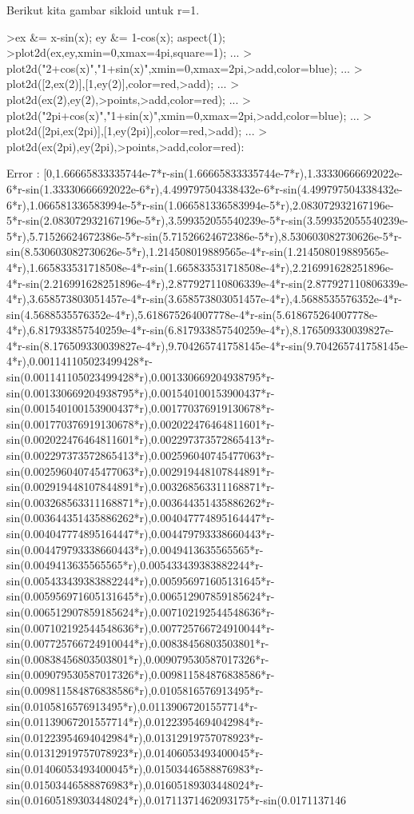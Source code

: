 \documentclass{article}
\begin{document}
\begin{eulernotebook}
\begin{eulercomment}
\begin{eulercomment}
\begin{eulercomment}
\begin{eulercomment}
\begin{euleroutput}
\end{euleroutput}
\begin{eulercomment}
Berikut kita gambar sikloid untuk r=1.
\end{eulercomment}
\begin{eulerprompt}
>ex &= x-sin(x); ey &= 1-cos(x); aspect(1);
>plot2d(ex,ey,xmin=0,xmax=4pi,square=1); ...
>  plot2d("2+cos(x)","1+sin(x)",xmin=0,xmax=2pi,>add,color=blue); ...
>  plot2d([2,ex(2)],[1,ey(2)],color=red,>add); ...
>  plot2d(ex(2),ey(2),>points,>add,color=red); ...
>  plot2d("2pi+cos(x)","1+sin(x)",xmin=0,xmax=2pi,>add,color=blue); ...
>  plot2d([2pi,ex(2pi)],[1,ey(2pi)],color=red,>add);  ...
>  plot2d(ex(2pi),ey(2pi),>points,>add,color=red):
\end{eulerprompt}
\begin{euleroutput}
  Error : [0,1.66665833335744e-7*r-sin(1.66665833335744e-7*r),1.33330666692022e-6*r-sin(1.33330666692022e-6*r),4.499797504338432e-6*r-sin(4.499797504338432e-6*r),1.066581336583994e-5*r-sin(1.066581336583994e-5*r),2.083072932167196e-5*r-sin(2.083072932167196e-5*r),3.599352055540239e-5*r-sin(3.599352055540239e-5*r),5.71526624672386e-5*r-sin(5.71526624672386e-5*r),8.530603082730626e-5*r-sin(8.530603082730626e-5*r),1.214508019889565e-4*r-sin(1.214508019889565e-4*r),1.665833531718508e-4*r-sin(1.665833531718508e-4*r),2.216991628251896e-4*r-sin(2.216991628251896e-4*r),2.877927110806339e-4*r-sin(2.877927110806339e-4*r),3.658573803051457e-4*r-sin(3.658573803051457e-4*r),4.5688535576352e-4*r-sin(4.5688535576352e-4*r),5.618675264007778e-4*r-sin(5.618675264007778e-4*r),6.817933857540259e-4*r-sin(6.817933857540259e-4*r),8.176509330039827e-4*r-sin(8.176509330039827e-4*r),9.704265741758145e-4*r-sin(9.704265741758145e-4*r),0.001141105023499428*r-sin(0.001141105023499428*r),0.001330669204938795*r-sin(0.001330669204938795*r),0.001540100153900437*r-sin(0.001540100153900437*r),0.001770376919130678*r-sin(0.001770376919130678*r),0.002022476464811601*r-sin(0.002022476464811601*r),0.002297373572865413*r-sin(0.002297373572865413*r),0.002596040745477063*r-sin(0.002596040745477063*r),0.002919448107844891*r-sin(0.002919448107844891*r),0.003268563311168871*r-sin(0.003268563311168871*r),0.003644351435886262*r-sin(0.003644351435886262*r),0.004047774895164447*r-sin(0.004047774895164447*r),0.004479793338660443*r-sin(0.004479793338660443*r),0.0049413635565565*r-sin(0.0049413635565565*r),0.005433439383882244*r-sin(0.005433439383882244*r),0.005956971605131645*r-sin(0.005956971605131645*r),0.006512907859185624*r-sin(0.006512907859185624*r),0.007102192544548636*r-sin(0.007102192544548636*r),0.007725766724910044*r-sin(0.007725766724910044*r),0.00838456803503801*r-sin(0.00838456803503801*r),0.009079530587017326*r-sin(0.009079530587017326*r),0.009811584876838586*r-sin(0.009811584876838586*r),0.0105816576913495*r-sin(0.0105816576913495*r),0.01139067201557714*r-sin(0.01139067201557714*r),0.01223954694042984*r-sin(0.01223954694042984*r),0.01312919757078923*r-sin(0.01312919757078923*r),0.01406053493400045*r-sin(0.01406053493400045*r),0.01503446588876983*r-sin(0.01503446588876983*r),0.01605189303448024*r-sin(0.01605189303448024*r),0.01711371462093175*r-sin(0.0171137146
\end{euleroutput}
\end{eulercomment}
\end{eulercomment}
\end{eulercomment}
\end{eulercomment}
\end{eulernotebook}
\end{document}
